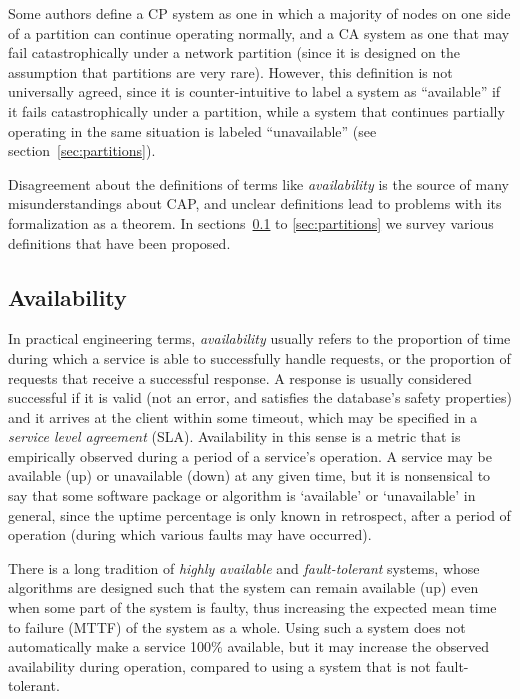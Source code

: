 \documentclass[fleqn,12pt,lineno]{wlpeerj} %
\begin{document}
Some authors \citep{Darcy2010ta,Liochon2015vt} define a CP system as one in which a majority of
nodes on one side of a partition can continue operating normally, and a CA system as one that may
fail catastrophically under a network partition (since it is designed on the assumption that
partitions are very rare). However, this definition is not universally agreed, since it is
counter-intuitive to label a system as ``available'' if it fails catastrophically under a partition,
while a system that continues partially operating in the same situation is labeled ``unavailable''
(see section~\ref{sec:partitions}).

Disagreement about the definitions of terms like \emph{availability} is the source of many
misunderstandings about CAP, and unclear definitions lead to problems with its formalization as a
theorem. In sections~\ref{sec:availability} to \ref{sec:partitions} we survey various definitions
that have been proposed.

\subsection{Availability}\label{sec:availability}

In practical engineering terms, \emph{availability} usually refers to the proportion of time during
which a service is able to successfully handle requests, or the proportion of requests that receive
a successful response. A response is usually considered successful if it is valid (not an error, and
satisfies the database's safety properties) and it arrives at the client within some timeout, which
may be specified in a \emph{service level agreement} (SLA). Availability in this sense is a metric
that is empirically observed during a period of a service's operation. A service may be available
(up) or unavailable (down) at any given time, but it is nonsensical to say that some software
package or algorithm is `available' or `unavailable' in general, since the uptime percentage is only
known in retrospect, after a period of operation (during which various faults may have occurred).

There is a long tradition of \emph{highly available} and \emph{fault-tolerant} systems, whose
algorithms are designed such that the system can remain available (up) even when some part of the
system is faulty, thus increasing the expected mean time to failure (MTTF) of the system as a whole.
Using such a system does not automatically make a service 100\% available, but it may increase the
observed availability during operation, compared to using a system that is not fault-tolerant.
\end{document}
